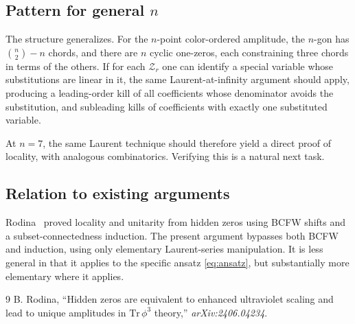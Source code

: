 \documentclass[11pt]{article}
\newcommand{\Z}{\mathcal{Z}}
\theoremstyle{definition}
\begin{document}
\subsection{Pattern for general $n$}

The structure generalizes. For the $n$-point color-ordered amplitude, the
$n$-gon has $\binom{n}{2}-n$ chords, and there are $n$ cyclic one-zeros, each
constraining three chords in terms of the others. If for each $\Z_r$ one can
identify a special variable whose substitutions are linear in it, the same
Laurent-at-infinity argument should apply, producing a leading-order kill of
all coefficients whose denominator avoids the substitution, and subleading
kills of coefficients with exactly one substituted variable.

At $n=7$, the same Laurent technique should therefore yield a direct proof of
locality, with analogous combinatorics. Verifying this is a natural next task.

\subsection{Relation to existing arguments}

Rodina~\cite{rodina} proved locality and unitarity from hidden zeros using
BCFW shifts and a subset-connectedness induction. The present argument
bypasses both BCFW and induction, using only elementary Laurent-series
manipulation. It is less general in that it applies to the specific ansatz
\eqref{eq:ansatz}, but substantially more elementary where it applies.

\begin{thebibliography}{9}
 B. Rodina, ``Hidden zeros are equivalent to enhanced
ultraviolet scaling and lead to unique amplitudes in $\mathrm{Tr}\,\phi^3$
theory,'' \emph{arXiv:2406.04234}.
\end{thebibliography}
\end{document}
